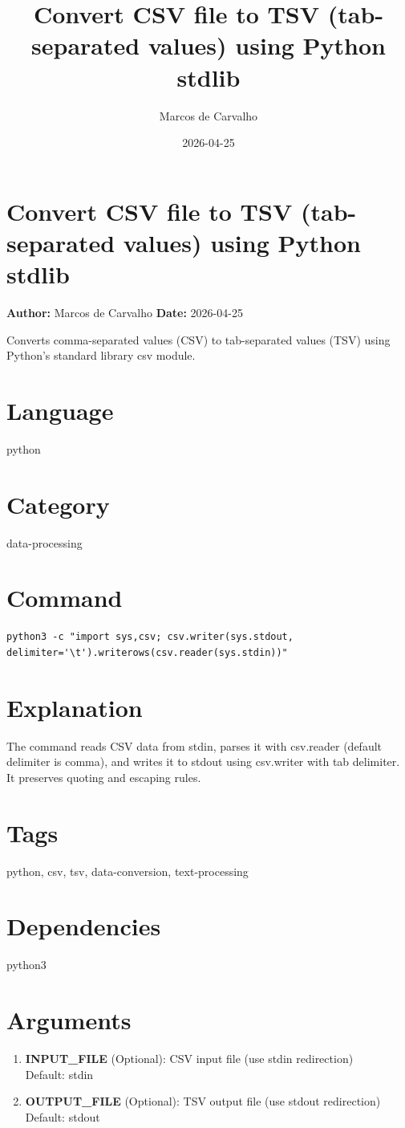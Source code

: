 \documentclass{article}
\title{Convert CSV file to TSV (tab-separated values) using Python stdlib}
\author{Marcos de Carvalho}
\date{2026-04-25}
\begin{document}
\section*{Convert CSV file to TSV (tab-separated values) using Python stdlib}
\textbf{Author:} Marcos de Carvalho \hfill \textbf{Date:} 2026-04-25

\noindent Converts comma-separated values (CSV) to tab-separated values (TSV) using Python's standard library csv module.

\section*{Language}
python

\section*{Category}
data-processing

\section*{Command}
\begin{lstlisting}
python3 -c "import sys,csv; csv.writer(sys.stdout, delimiter='\t').writerows(csv.reader(sys.stdin))"
\end{lstlisting}

\section*{Explanation}
The command reads CSV data from stdin, parses it with csv.reader (default delimiter is comma), and writes it to stdout using csv.writer with tab delimiter. It preserves quoting and escaping rules.

\section*{Tags}
python, csv, tsv, data-conversion, text-processing

\section*{Dependencies}
python3


\section*{Arguments}
\begin{enumerate}
  \item \textbf{INPUT\_FILE} (Optional): CSV input file (use stdin redirection) \\ Default: stdin
  \item \textbf{OUTPUT\_FILE} (Optional): TSV output file (use stdout redirection) \\ Default: stdout
\end{enumerate}
\end{document}
